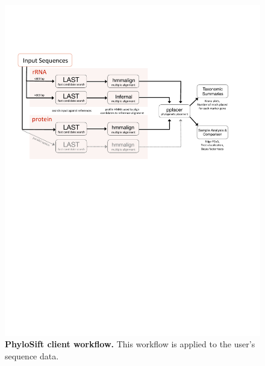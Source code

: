 \documentclass[10pt]{article}
\begin{document}
\begin{figure}[hp]
\begin{center}
\includegraphics[width=6.5in]{figures/Phylosift_overview_oct2012_vector.pdf}
\end{center}
\caption{\textbf{PhyloSift client workflow.} This workflow is applied to the user's sequence data.}
\label{fig:overview}
\end{figure}
\end{document}
